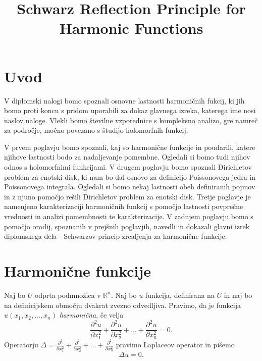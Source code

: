 \documentclass[mat1]{fmfdelo}
\title{Schwarz Reflection Principle for Harmonic Functions}
\begin{document}
\section{Uvod}
V diplomski nalogi bomo spoznali osnovne lastnosti harmoničnih fukcij, ki jih bomo proti koncu s pridom uporabili za dokaz glavnega izreka, katerega ime nosi naslov naloge.
Vlekli bomo številne vzporednice s kompleksno analizo, gre namreč za področje, močno povezano s študijo holomorfnih funkcij.

V prvem poglavju bomo spoznali, kaj so harmonične funkcije in poudarili, katere njihove lastnosti bodo za nadaljevanje pomembne. Ogledali si bomo tudi njihov odnos s holomorfnimi funkcijami. 
V drugem poglavju bomo spoznali Dirichletov problem za enotski disk, ki nam bo dal osnovo za definicijo Poissonovega jedra in Poissonovega integrala. Ogledali si bomo nekaj lastnosti obeh definiranih pojmov in z njuno pomočjo rešili Dirichletov problem za enotski disk.
Tretje poglavje je namenjeno karakterizaciji harmoničnih funkcij s pomočjo lastnosti povprečne vrednosti in analizi pomembnosti te karakterizacije. 
V zadnjem poglavju bomo s pomočjo orodij, spoznanih v prejšnih poglavjih, navedli in dokazali glavni izrek diplomskega dela - Schwarzov princip zrcaljenja za harmonične funkcije.
%

\newpage
\section{Harmonične funkcije}
    \begin{definicija}
        \label{harm}
        Naj bo $U$ odprta podmnožica v $\mathbb{R}^n$. Naj bo $u$ funkcija, definirana na $U$ in naj bo na definicijskem območju dvakrat zvezno odvedljiva.  
        Pravimo, da je funkcija $u(x_1, x_2, \dots, x_n)$ \emph{harmonična}, če velja
        $$
        \frac{\partial^2 u}{\partial x_1 ^ 2} +  \frac{\partial^2 u}{\partial x_2 ^ 2} + \dots + \frac{\partial^2 u}{\partial x_n ^ 2} = 0.
        $$
        Operatorju $\Delta  = \frac{\partial^2}{\partial x_1 ^ 2} +  \frac{\partial^2}{\partial x_2 ^ 2} + \dots + \frac{\partial^2}{\partial x_n ^ 2}$ pravimo Laplaceov operator in pišemo
        $$
        \Delta u = 0.
        $$
    \end{definicija}
\end{document}
